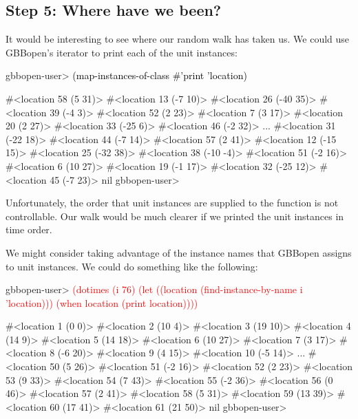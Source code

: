 \documentclass[10pt,twoside,english,pdftex]{article}
\begin{document}
\subsection*{Step 5:  Where have we been?}

%
%
It would be interesting to see where our random walk has taken us.  We could
use GBBopen's  iterator to print each of
the  unit instances:
%
\W\supp
\begin{example}
\textcolor{darkergray}{%
  gbbopen-user> \textcolor{black}{(map-instances-of-class #'print 'location)}

  #<location 58 (5 31)> 
  #<location 13 (-7 10)> 
  #<location 26 (-40 35)> 
  #<location 39 (-4 3)> 
  #<location 52 (2 23)> 
  #<location 7 (3 17)> 
  #<location 20 (2 27)> 
  #<location 33 (-25 6)> 
  #<location 46 (-2 32)> 
       ...
  #<location 31 (-22 18)> 
  #<location 44 (-7 14)> 
  #<location 57 (2 41)> 
  #<location 12 (-15 15)> 
  #<location 25 (-32 38)> 
  #<location 38 (-10 -4)> 
  #<location 51 (-2 16)> 
  #<location 6 (10 27)> 
  #<location 19 (-1 17)> 
  #<location 32 (-25 12)> 
  #<location 45 (-7 23)> 
  nil
  gbbopen-user>}
\end{example}
%
Unfortunately, the order that unit instances are supplied to the 
function is not controllable.  Our walk would be much clearer if we printed
the  unit instances in time order.

%
%
We might consider taking advantage of the instance names that GBBopen assigns
to unit instances.  We could do something like the following:
%
\W\supp
\begin{example}
\textcolor{darkergray}{%
  gbbopen-user> \textcolor{red}{(dotimes (i 76)
                  (let ((location (find-instance-by-name i 'location)))
                    (when location
                       (print location))))}

  #<location 1 (0 0)> 
  #<location 2 (10 4)> 
  #<location 3 (19 10)> 
  #<location 4 (14 9)> 
  #<location 5 (14 18)> 
  #<location 6 (10 27)> 
  #<location 7 (3 17)> 
  #<location 8 (-6 20)> 
  #<location 9 (4 15)> 
  #<location 10 (-5 14)> 
       ...
  #<location 50 (5 26)> 
  #<location 51 (-2 16)> 
  #<location 52 (2 23)> 
  #<location 53 (9 33)> 
  #<location 54 (7 43)> 
  #<location 55 (-2 36)> 
  #<location 56 (0 46)> 
  #<location 57 (2 41)> 
  #<location 58 (5 31)> 
  #<location 59 (13 39)> 
  #<location 60 (17 41)> 
  #<location 61 (21 50)> 
  nil
  gbbopen-user>}
\end{example}
\end{document}
